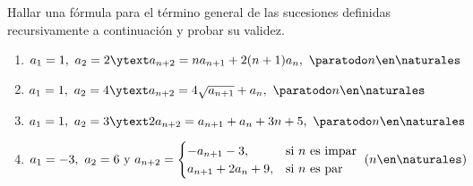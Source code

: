 \begin{enunciado}{\ejercicio}
  Hallar una fórmula para el término general de las sucesiones definidas recursivamente a continuación
  y probar su validez.
  \begin{enumerate}[label=\roman*)]
    \item $a_1 = 1,\ a_2 = 2  \ytext a_{n+2} = n a_{n+1} + 2(n+1)a_n,\ \paratodo n \en \naturales $
    \item $a_1 = 1,\ a_2 = 4  \ytext a_{n+2} = 4 \sqrt{a_{n+1}} + a_n,\ \paratodo n \en \naturales $
    \item $a_1 = 1,\ a_2 = 3  \ytext 2 a_{n+2} = a_{n+1} + a_n + 3n + 5,\ \paratodo n \en \naturales $
    \item $a_1 = -3,\ a_2 = 6 \text{ y }
            a_{n+2} =
            \begin{cases}
              -a_{n+1} - 3,        & \text{si $n$ es impar} \\
              a_{n+1} + 2 a_n + 9, & \text{si $n$ es par}
            \end{cases}
            \  (n \en \naturales )$
  \end{enumerate}
\end{enunciado}

